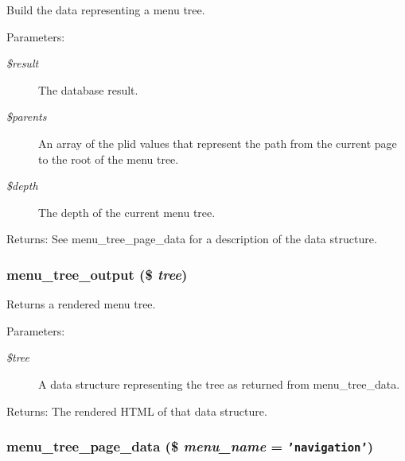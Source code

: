Build the data representing a menu tree.

\begin{Desc}
\item[Parameters:]
\begin{description}
\item[{\em \$result}]The database result. \item[{\em \$parents}]An array of the plid values that represent the path from the current page to the root of the menu tree. \item[{\em \$depth}]The depth of the current menu tree. \end{description}
\end{Desc}
\begin{Desc}
\item[Returns:]See menu\_\-tree\_\-page\_\-data for a description of the data structure. \end{Desc}
\hypertarget{group__menu_g2ef0691992a9df71eb3455ba774053e7}{
\subsubsection[{menu\_\-tree\_\-output}]{\setlength{\rightskip}{0pt plus 5cm}menu\_\-tree\_\-output (\$ {\em tree})}}
\label{group__menu_g2ef0691992a9df71eb3455ba774053e7}


Returns a rendered menu tree.

\begin{Desc}
\item[Parameters:]
\begin{description}
\item[{\em \$tree}]A data structure representing the tree as returned from menu\_\-tree\_\-data. \end{description}
\end{Desc}
\begin{Desc}
\item[Returns:]The rendered HTML of that data structure. \end{Desc}
\hypertarget{group__menu_g84e2ecf44d5b72159370c74c910e93e3}{
\subsubsection[{menu\_\-tree\_\-page\_\-data}]{\setlength{\rightskip}{0pt plus 5cm}menu\_\-tree\_\-page\_\-data (\$ {\em menu\_\-name} = {\tt 'navigation'})}}
\label{group__menu_g84e2ecf44d5b72159370c74c910e93e3}


